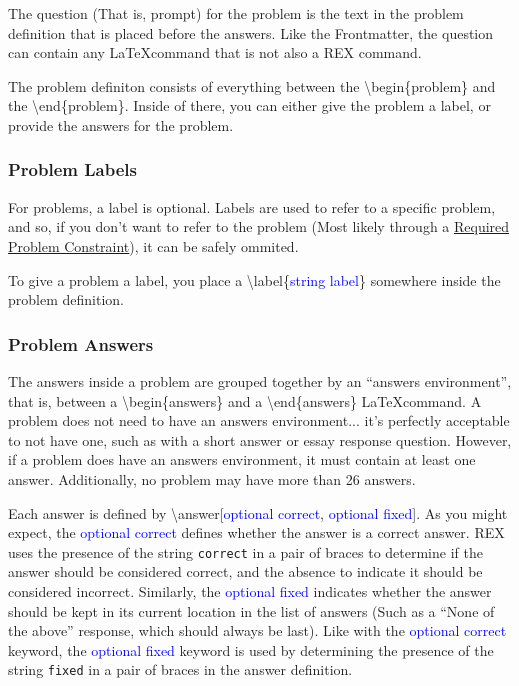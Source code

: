 \documentclass{article}
\begin{document}
The question (That is, prompt) for the problem is the text in the problem definition that is placed before the answers. Like the Frontmatter, the question can contain any \LaTeX command that is not also a REX command.

The problem definiton consists of everything between the \textbackslash{begin}\{problem\} and the \textbackslash{end}\{problem\}. Inside of there, you can either give the problem a label, or provide the answers for the problem.

\subsubsection{Problem Labels}
For problems, a label is optional. Labels are used to refer to a specific problem, and so, if you don't want to refer to the problem (Most likely through a \hyperref[RequiredProblemConstraints]{Required Problem Constraint}), it can be safely ommited.

To give a problem a label, you place a \textbackslash{label}\{\textcolor{blue}{string label}\} somewhere inside the problem definition.

\subsubsection{Problem Answers}
The answers inside a problem are grouped together by an ``answers environment'', that is, between a \textbackslash{begin}\{answers\} and a \textbackslash{end}\{answers\} \LaTeX command. A problem does not need to have an answers environment... it's perfectly acceptable to not have one, such as with a short answer or essay response question. However, if a problem does have an answers environment, it must contain at least one answer. Additionally, no problem may have more than 26 answers.

Each answer is defined by \textbackslash{answer}[\textcolor{blue}{optional correct}, \textcolor{blue}{optional fixed}]. As you might expect, the \textcolor{blue}{optional correct} defines whether the answer is a correct answer. REX uses the presence of the string \texttt{correct} in a pair of braces to determine if the answer should be considered correct, and the absence to indicate it should be considered incorrect. Similarly, the \textcolor{blue}{optional fixed} indicates whether the answer should be kept in its current location in the list of answers (Such as a ``None of the above'' response, which should always be last). Like with the \textcolor{blue}{optional correct} keyword, the \textcolor{blue}{optional fixed} keyword is used by determining the presence of the string \texttt{fixed} in a pair of braces in the answer definition.
\end{document}
